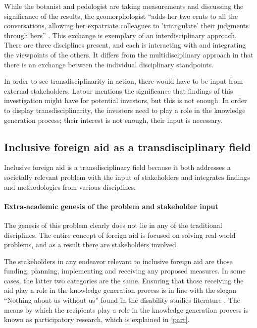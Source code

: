\documentclass[a4paper]{article}
\begin{document}
While the botanist and pedologist are taking measurements and discussing the
significance of the results, the geomorphologist ``adds her two cents to all
the conversations, allowing her expatriate colleagues to 'triangulate' their
judgments through hers'' \citep{latour1999circulating}. This exchange is
exemplary of an interdisciplinary approach. There are three disciplines
present, and each is interacting with  and integrating the viewpoints of the
others. It differs from the multidisciplinary approach in that there is an
exchange between the individual disciplinary standpoints.

In order to see transdisciplinarity in action, there would have to be input
from external stakeholders. Latour mentions the significance that findings of
this investigation might have for potential investors, but this is not enough.
In order to display transdisciplinarity, the investors need to play a role in
the knowledge generation process; their interest is not enough, their input is
necessary.


\subsection{Inclusive foreign aid as a transdisciplinary field}

Inclusive foreign aid is a transdisciplinary field because it both addresses a
societally relevant problem with the input of stakeholders and integrates
findings and methodologies from various disciplines.

\paragraph{Extra-academic genesis of the problem and stakeholder input}

The genesis of this problem clearly does not lie in any of the traditional
disciplines. The entire concept of foreign aid is focused on solving
real-world problems, and as a result there are stakeholders involved.

The stakeholders in any endeavor relevant to inclusive foreign aid are those
funding, planning, implementing and receiving any proposed measures. In some
cases, the latter two categories are the same. Ensuring that those receiving
the aid play a role in the knowledge generation process is in line with the
slogan ``Nothing about us without us'' found in the disability studies
literature \citep{pfeiffer2000disability}. The means by which the recipients
play a role in the knowledge generation process is known as participatory
research, which is explained in \autoref{part}.
\end{document}
